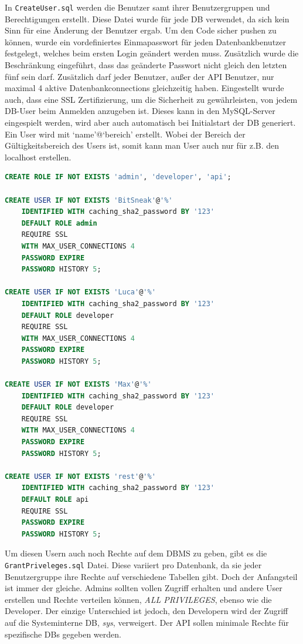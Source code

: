 \documentclass[
    headings=optiontotocandhead,%
    twoside,
    numbers=noenddot,%
    12pt, %
    titlepage, %
    parskip=full, %
    listof=leveldown, 
    numbers=noenddot, %
    a4paper,DIV=14,
    BCOR=15mm,
]{scrbook}
\newcommand{\passthrough}[1]{#1}
\begin{document}
In \passthrough{\lstinline!CreateUser.sql!} werden die Benutzer samt
ihrer Benutzergruppen und Berechtigungen erstellt. Diese Datei wurde für
jede DB verwendet, da sich kein Sinn für eine Änderung der Benutzer
ergab. Um den Code sicher pushen zu können, wurde ein vordefiniertes
Einmapasswort für jeden Datenbankbenutzer festgelegt, welches beim
ersten Login geändert werden muss. Zusätzlich wurde die Beschränkung
eingeführt, dass das geänderte Passwort nicht gleich den letzten fünf
sein darf. Zusätzlich darf jeder Benutzer, außer der API Benutzer, nur
maximal 4 aktive Datenbankconnections gleichzeitig haben. Eingestellt
wurde auch, dass eine SSL Zertifizierung, um die Sicherheit zu
gewährleisten, von jedem DB-User beim Anmelden anzugeben ist. Dieses
kann in den MySQL-Server eingespielt werden, wird aber auch automatisch
bei Initialstart der DB generiert. Ein User wird mit `name'@`bereich'
erstellt. Wobei der Bereich der Gültigkeitsbereich des Users ist, somit
kann man User auch nur für z.B. den localhost erstellen.

\begin{lstlisting}[language=SQL, caption={Erstellen von Benutzergruppen und Benutzern in MySQL}]
CREATE ROLE IF NOT EXISTS 'admin', 'developer', 'api';

CREATE USER IF NOT EXISTS 'BitSneak'@'%'
    IDENTIFIED WITH caching_sha2_password BY '123'
    DEFAULT ROLE admin
    REQUIRE SSL
    WITH MAX_USER_CONNECTIONS 4
    PASSWORD EXPIRE
    PASSWORD HISTORY 5;

CREATE USER IF NOT EXISTS 'Luca'@'%'
    IDENTIFIED WITH caching_sha2_password BY '123'
    DEFAULT ROLE developer
    REQUIRE SSL
    WITH MAX_USER_CONNECTIONS 4
    PASSWORD EXPIRE
    PASSWORD HISTORY 5;

CREATE USER IF NOT EXISTS 'Max'@'%'
    IDENTIFIED WITH caching_sha2_password BY '123'
    DEFAULT ROLE developer
    REQUIRE SSL
    WITH MAX_USER_CONNECTIONS 4
    PASSWORD EXPIRE
    PASSWORD HISTORY 5;

CREATE USER IF NOT EXISTS 'rest'@'%'
    IDENTIFIED WITH caching_sha2_password BY '123'
    DEFAULT ROLE api
    REQUIRE SSL
    PASSWORD EXPIRE
    PASSWORD HISTORY 5;
\end{lstlisting}

Um diesen Usern auch noch Rechte auf dem DBMS zu geben, gibt es die
\passthrough{\lstinline!GrantPriveleges.sql!} Datei. Diese variiert pro
Datenbank, da sie jeder Benutzergruppe ihre Rechte auf verschiedene
Tabellen gibt. Doch der Anfangsteil ist immer der gleiche. Admins
sollten vollen Zugriff erhalten und andere User erstellen und Rechte
verteilen können, \emph{ALL PRIVILEGES}, ebenso wie die Developer. Der
einzige Unterschied ist jedoch, den Developern wird der Zugriff auf die
Systeminterne DB, \emph{sys}, verweigert. Der API sollen minimale Rechte
für spezifische DBs gegeben werden.
\end{document}
